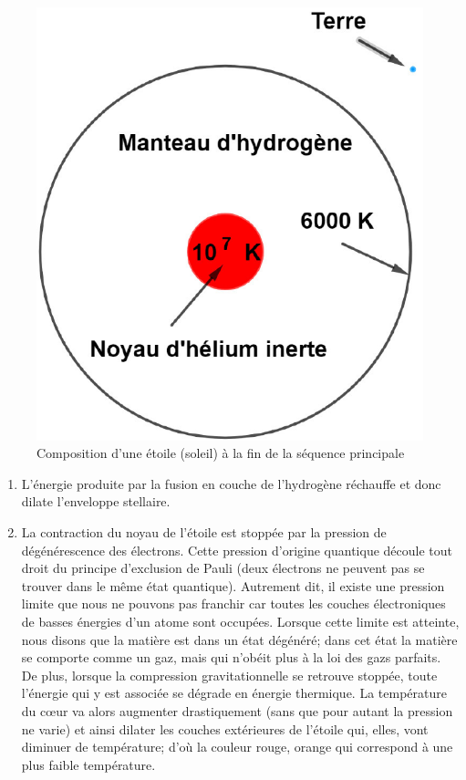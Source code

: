 \begin{figure}[H]\vspace{1cm}
	\centering
	\includegraphics[scale=0.45]{images/compo_sp}
	\caption[Composition d'une étoile (soleil) à la fin de la séquence principale -figure réalisée avec GeoGebra]{Composition d'une étoile (soleil) à la fin de la séquence principale}
	\label{Fig. 2.3}
\end{figure}\bigskip                         

\begin{enumerate}
	\item L’énergie produite par la fusion en couche de l’hydrogène réchauffe et donc dilate l’enveloppe stellaire.
	\item La contraction du noyau de l’étoile est stoppée par la pression de dégénérescence des électrons. Cette pression d’origine quantique découle tout droit du principe d’exclusion de Pauli (deux électrons ne peuvent pas se trouver dans le même état quantique). Autrement dit, il existe une pression limite que nous ne pouvons pas franchir car toutes les couches électroniques de basses énergies d’un atome sont occupées. Lorsque cette limite est atteinte, nous disons que la matière est dans un état dégénéré; dans cet état la matière se comporte comme un gaz, mais qui n'obéit plus à la loi des gazs parfaits. De plus, lorsque la compression gravitationnelle se retrouve stoppée, toute l'énergie qui y est associée se dégrade en énergie thermique. La température du cœur va alors augmenter drastiquement (sans que pour autant la pression ne varie) et ainsi dilater les couches extérieures de l’étoile qui, elles, vont diminuer de température; d’où la couleur rouge, orange qui correspond à une plus faible température. 
	
\end{enumerate}

